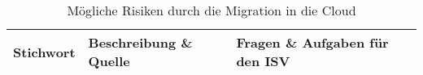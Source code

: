 \begin{table}[ht!]
\centering
\begin{longtable}{|p{}|p{}|p{}|}
\hline
\textbf{Stichwort} & \textbf{Beschreibung \& Quelle} & \textbf{Fragen \& 
Aufgaben für den ISV} \\
\hline %

\hline %
\end{longtable}
\caption{Mögliche Risiken durch die Migration in die Cloud}
\label{tab:risiken_der_cloud}
\end{table}